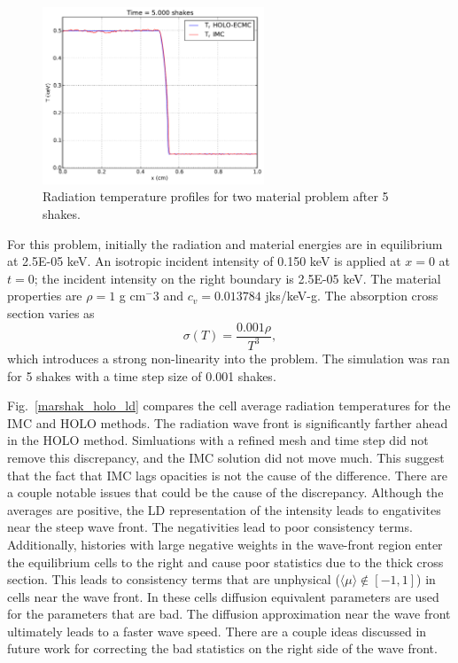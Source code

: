\documentclass{mc2013}
\newcommand{\mom}[1]{\langle #1 \rangle}
\begin{document}
    \begin{figure}
    \centering
    \includegraphics[width=0.59\textwidth]{twomat_full.pdf}
    \caption{Radiation temperature profiles for two material problem after 5 shakes.\label{twomat_full}}
    \end{figure}


For this problem, initially the radiation and material energies are in equilibrium at 2.5E-05 keV.   An isotropic incident intensity of 0.150 keV
is applied at $x=0$ at $t=0$; the incident intensity on the right boundary is 2.5E-05 keV.  The material properties are $\rho = 1$ g cm$^-3$ and $c_v = 0.013784$ jks/keV-g. The absorption cross section varies as
\begin{equation}
\sigma(T) = \frac{0.001 \rho}{T^3},
\end{equation}
which introduces a strong non-linearity into the problem.   The simulation was ran for 5 shakes with a
time step size of 0.001 shakes. 

Fig.~\ref{marshak_holo_ld} compares the cell average radiation temperatures for the IMC and HOLO methods.  The radiation wave front is significantly farther ahead in the HOLO method.  Simluations with a refined mesh and time step did not remove this discrepancy, and the IMC solution did not move much.  This suggest that the fact that IMC lags opacities is not the cause of the difference.  There are a couple notable issues that could be the cause of the discrepancy.  Although the averages are positive, the LD representation of the intensity leads to engativites near the steep wave front.  The negativities lead to poor consistency terms.  Additionally, histories with large negative weights in the wave-front region enter the equilibrium cells to the right and cause poor statistics due to the thick cross section.  This leads to consistency terms that are unphysical ($\mom{\mu} \notin [ -1, 1]$) in cells near the wave front.  In these cells diffusion equivalent  parameters are used for the parameters that are bad.  The diffusion approximation near the wave front ultimately leads to a faster wave speed.  There are a couple ideas discussed in future work for correcting the bad statistics on the right side of the wave front.
\end{document}
